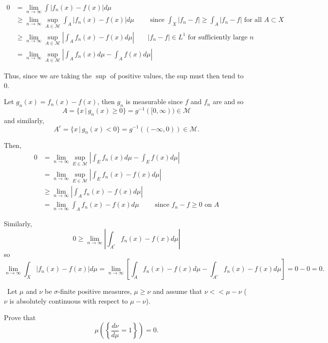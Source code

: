\documentclass[12pt]{Homework}
\begin{document}
\begin{solution}$\,$
\boxed{\implies} \begin{align*}
    0&=\lim_{n\to\infty}\int|f_n(x)-f(x)|d\mu\\
    &\ge\lim_{n\to\infty}\sup_{A\in\mathscr{M}}\int_A|f_n(x)-f(x)|d\mu\qquad\text{ since }\int_X|f_n-f|\ge\int_A|f_n-f|\text{ for all }A\subset X\\
    &\ge\lim_{n\to\infty}\sup_{A\in\mathscr{M}}\left|\int_Af_n(x)-f(x)d\mu\right|\qquad |f_n-f|\in L^1\text{ for sufficiently large }n\\
    &=\lim_{n\to\infty}\sup_{A\in\mathscr{M}}\left|\int_A f_n(x)d\mu-\int_Af(x)d\mu\right|
\end{align*}

Thus, since we are taking the $\sup$ of positive values, the sup must then tend to $0$.

\boxed{\impliedby} Let $g_n(x)=f_n(x)-f(x)$, then $g_n$ is measurable since $f$ and $f_n$ are and so $$A=\{x\,|\,g_n(x)\ge 0\}=g^{-1}([0,\infty))\in\mathscr{M}$$ and similarly, $$A^c=\{x\,|\, g_n(x)<0\}=g^{-1}((-\infty,0))\in\mathscr{M}.$$

Then, \begin{align*}
    0&=\lim_{n\to\infty}\sup_{E\in\mathscr{M}}\left|\int_Ef_n(x)d\mu-\int_Ef(x)d\mu\right|\\
    &=\lim_{n\to\infty}\sup_{E\in\mathscr{M}}\left|\int_Ef_n(x)-f(x)d\mu\right|\\
    &\ge\lim_{n\to\infty}\left|\int_Af_n(x)-f(x)d\mu\right|\\
    &=\lim_{n\to\infty}\int_Af_n(x)-f(x)d\mu\qquad\text{ since }f_n-f\ge0\text{ on }A
\end{align*}

Similarly, $$0\ge\lim_{n\to\infty}\left|\int_{A^c}f_n(x)-f(x)d\mu\right|$$ so $$\lim_{n\to\infty}\int_X|f_n(x)-f(x)|d\mu=\lim_{n\to\infty}\left[\int_Af_n(x)-f(x)d\mu-\int_{A^c}f_n(x)-f(x)d\mu\right]=0-0=0.$$
\end{solution}
\newpage

\begin{problem} $\,$
Let $\mu$ and $\nu$ be $\sigma$-finite positive measures, $\mu\ge\nu$ and assume that $\nu<<\mu-\nu$ ($\nu$ is absolutely continuous with respect to $\mu-\nu$).

Prove that $$\mu\left(\left\{\frac{d\nu}{d\mu}=1\right\}\right)=0.$$
\end{problem}
\end{document}
